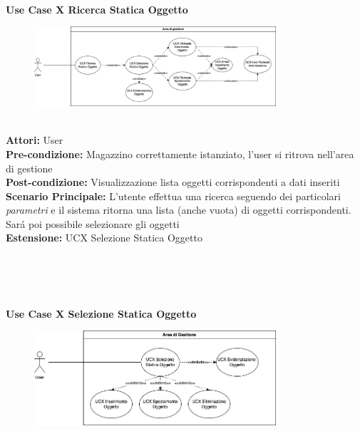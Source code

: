\vspace{0.5cm}

\Large\textbf{}\\
\Large\textbf{Use Case X Ricerca Statica Oggetto} \\
\vspace{0.5cm}
\begin{figure}[h]
  \centering
  \includegraphics[width=0.8\textwidth]{UseCasesImages/StaticRes.png}
\end{figure}

\large\textbf{} \\
\textbf{Attori:} User\\
\textbf{Pre-condizione:} Magazzino correttamente istanziato, l'user si ritrova nell'area di gestione \\
\textbf{Post-condizione: } Visualizzazione lista oggetti corrispondenti a dati inseriti\\
\textbf{Scenario Principale:}  L'utente effettua una ricerca seguendo dei particolari \textit{parametri} e il sistema ritorna una lista (anche vuota) di oggetti corrispondenti. Sará poi possibile selezionare gli oggetti\\
\textbf{Estensione:} UCX Selezione Statica Oggetto

\textbf{}\\
{}\\

\vspace{0.5cm}

\Large\textbf{}\\
\Large\textbf{Use Case X Selezione Statica Oggetto} \\
\begin{figure}[h]
  \centering
  \includegraphics[width=0.8\textwidth]{UseCasesImages/StaticSel.png}
\end{figure}

